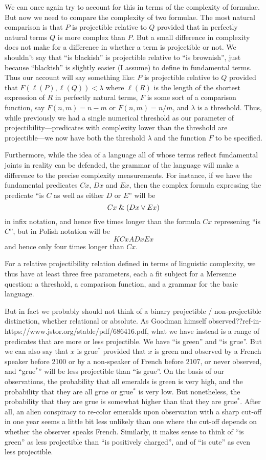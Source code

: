 We can once again try to account for this in terms of the complexity of formulae. But now we need to compare the complexity of
two formulae. The most natural comparison is that $P$ is projectible relative to $Q$ provided that in perfectly
natural terms $Q$ is more complex than $P$. But a small difference in complexity does not make for a difference
in whether a term is projectible or not. We shouldn't say that ``is blackish'' is projectible relative to 
``is brownish'', just because ``blackish'' is slightly easier (I assume) to define in fundamental terms. 
Thus our account will say something like: $P$ is projectible relative to $Q$ provided that 
$F(\ell(P),\ell(Q))<\lambda$ where $\ell(R)$ is the length of the shortest expression of $R$ in perfectly
natural terms, $F$ is some sort of a comparison function, say $F(n,m)=n-m$ or $F(n,m)=n/m$, and $\lambda$ is
a threshold. Thus, while previously we had a single numerical threshold 
as our parameter of projectibility---predicates with complexity lower than the threshold are projectible---we now have 
both the threshold $\lambda$ and the function $F$ to be specified.

Furthermore, while the idea of a language all of whose terms reflect fundamental joints in reality can be defended, the grammar
of the language will make a difference to the precise complexity measurements. For instance, if we have the fundamental predicates 
$Cx$, $Dx$ and $Ex$, then the complex formula expressing the predicate ``is $C$ as well as either $D$ or $E$'' will be 
$$
    Cx \mathrel{\&} (Dx \vee Ex)
$$    
    in infix notation, and hence five times longer than the formula $Cx$ represening ``is $C$'', but in Polish notation 
    will be 
$$
    KCxADxEx
$$    
and hence only four times longer than $Cx$.

For a relative projectibility relation defined in terms of linguistic complexity, we thus have at least three free parameters,
each a fit subject for a Mersenne question: a threshold, a comparison function, and a grammar for the basic language.

But in fact we probably should not think of a binary projectible / non-projectible distinction, whether
relational or absolute. As Goodman himself observed??ref-in-https://www.jstor.org/stable/pdf/686416.pdf, what we have instead is a range of predicates that are more or less projectible. We have ``is green'' and
``is grue''. But we can also say that $x$ is grue$^*$ provided that $x$ is green and observed by a French speaker before 2100 or by a 
non-speaker of French before 2107, or never observed, and ``grue$^*$'' will be less projectible than ``is grue''. On the basis of our observations, the
probability that all emeralds is green is very high, and the probability that they are all grue or grue$^*$ is very low. But
nonetheless, the probability that they are grue is somewhat higher than that they are grue$^*$. After all, an alien conspiracy to
re-color emeralds upon observation with a sharp cut-off in one year seems a little bit less unlikely than one where the cut-off 
depends on whether the observer speaks French. Similarly, it makes sense to think of ``is green'' as less projectible than ``is positively
charged'', and of ``is cute'' as even less projectible. 

